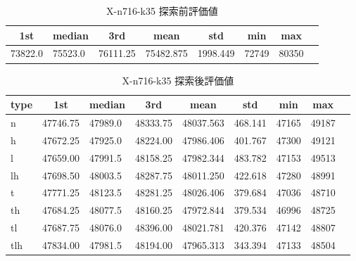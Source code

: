 \begin{table}[htbp]
    \centering
    \caption{X-n716-k35 探索前評価値}
    \begin{tabular}{|l|l|l|l|l|l|l|l|}\hline
    \multicolumn{1}{|c|}{\textbf{1st}}
    &\multicolumn{1}{c|}{\textbf{median}}
    &\multicolumn{1}{c|}{\textbf{3rd}}
    &\multicolumn{1}{c|}{\textbf{mean}}
    &\multicolumn{1}{c|}{\textbf{std}}
    &\multicolumn{1}{c|}{\textbf{min}}
    &\multicolumn{1}{c|}{\textbf{max}}\\\hline
	73822.0 & 75523.0 & 76111.25 & 75482.875 & 1998.449 & 72749 & 80350\\\hline
	\end{tabular}
\end{table}
\begin{table}[htbp]
    \centering
    \caption{X-n716-k35 探索後評価値}
    \begin{tabular}{|l|l|l|l|l|l|l|l|l|}\hline
    \multicolumn{1}{|c|}{\textbf{type}}
    &\multicolumn{1}{|c|}{\textbf{1st}}
    &\multicolumn{1}{c|}{\textbf{median}}
    &\multicolumn{1}{c|}{\textbf{3rd}}
    &\multicolumn{1}{c|}{\textbf{mean}}
    &\multicolumn{1}{c|}{\textbf{std}}
    &\multicolumn{1}{c|}{\textbf{min}}
    &\multicolumn{1}{c|}{\textbf{max}}\\\hline
	n & 47746.75 & 47989.0 & 48333.75 & 48037.563 & 468.141 & 47165 & 49187\\\hline
	h & 47672.25 & 47925.0 & 48224.00 & 47986.406 & 401.767 & 47300 & 49121\\\hline
	l & 47659.00 & 47991.5 & 48158.25 & 47982.344 & 483.782 & 47153 & 49513\\\hline
	lh & 47698.50 & 48003.5 & 48287.75 & 48011.250 & 422.618 & 47280 & 48991\\\hline
	t & 47771.25 & 48123.5 & 48281.25 & 48026.406 & 379.684 & 47036 & 48710\\\hline
	th & 47684.25 & 48077.5 & 48160.25 & 47972.844 & 379.534 & 46996 & 48725\\\hline
	tl & 47687.75 & 48076.0 & 48396.00 & 48021.781 & 420.376 & 47142 & 48807\\\hline
	tlh & 47834.00 & 47981.5 & 48194.00 & 47965.313 & 343.394 & 47133 & 48504\\\hline
	\end{tabular}
\end{table}
